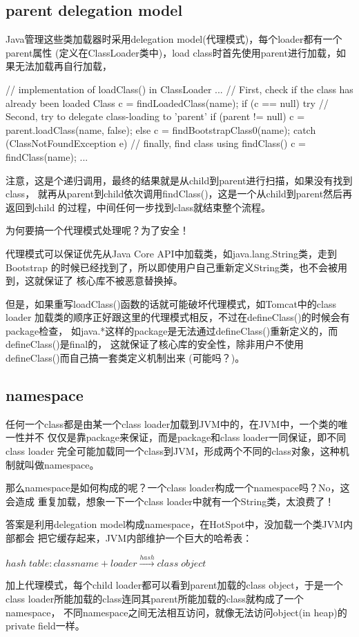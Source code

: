 \subsection[parent delegation model]{parent delegation model}
\label{sec:delegationmodel}
Java管理这些类加载器时采用delegation model(代理模式)，每个loader都有一个parent属性
(定义在ClassLoader类中)，load class时首先使用parent进行加载，如果无法加载再自行加载，

\begin{javacode}
// implementation of loadClass() in ClassLoader
...
// First, check if the class has already been loaded
Class c = findLoadedClass(name);
if (c == null) {
  try {
    // Second, try to delegate class-loading to 'parent'
    if (parent != null) {
      c = parent.loadClass(name, false);
    } else {
      c = findBootstrapClass0(name);
    }
  } catch (ClassNotFoundException e) {
    // finally, find class using findClass()
    c = findClass(name);
  }
}
...
\end{javacode}

注意，这是个递归调用，最终的结果就是从child到parent进行扫描，如果没有找到class，
就再从parent到child依次调用findClass()，这是一个从child到parent然后再返回到child
的过程，中间任何一步找到class就结束整个流程。

为何要搞一个代理模式处理呢？为了安全！

代理模式可以保证优先从Java Core API中加载类，如java.lang.String类，走到Bootstrap
的时候已经找到了，所以即使用户自己重新定义String类，也不会被用到，这就保证了
核心库不被恶意替换掉。

但是，如果重写loadClass()函数的话就可能破坏代理模式，如Tomcat中的class loader
加载类的顺序正好跟这里的代理模式相反，不过在defineClass()的时候会有package检查，
如java.*这样的package是无法通过defineClass()重新定义的，而defineClass()是final的，
这就保证了核心库的安全性，除非用户不使用defineClass()而自己搞一套类定义机制出来
(可能吗？)。

\subsection[namespace]{namespace}
任何一个class都是由某一个class loader加载到JVM中的，在JVM中，一个类的唯一性并不
仅仅是靠package来保证，而是package和class loader一同保证，即不同class loader
完全可能加载同一个class到JVM，形成两个不同的class对象，这种机制就叫做namespace。

那么namespace是如何构成的呢？一个class loader构成一个namespace吗？No，这会造成
重复加载，想象一下一个class loader中就有一个String类，太浪费了！

答案是利用delegation model构成namespace，在HotSpot中，没加载一个类JVM内部都会
把它缓存起来，JVM内部维护一个巨大的哈希表：

$hash\;table: classname+loader \stackrel{hash}{\longrightarrow} class\;object$

加上代理模式，每个child loader都可以看到parent加载的class object，于是一个
class loader所能加载的class连同其parent所能加载的class就构成了一个namespace，
不同namespace之间无法相互访问，就像无法访问object(in heap)的private field一样。